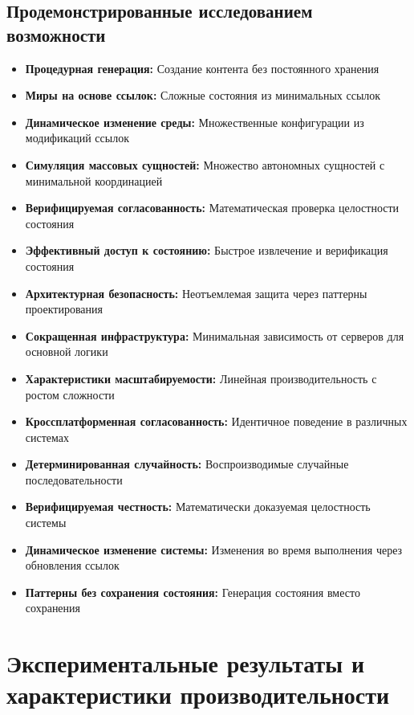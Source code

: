 \documentclass[14pt, a4paper]{extarticle}
\begin{document}
\subsection{Продемонстрированные исследованием возможности}
\begin{itemize}
    \item \textbf{Процедурная генерация:} Создание контента без постоянного хранения
    \item \textbf{Миры на основе ссылок:} Сложные состояния из минимальных ссылок
    \item \textbf{Динамическое изменение среды:} Множественные конфигурации из модификаций ссылок
    \item \textbf{Симуляция массовых сущностей:} Множество автономных сущностей с минимальной координацией
    \item \textbf{Верифицируемая согласованность:} Математическая проверка целостности состояния
    \item \textbf{Эффективный доступ к состоянию:} Быстрое извлечение и верификация состояния
    \item \textbf{Архитектурная безопасность:} Неотъемлемая защита через паттерны проектирования
    \item \textbf{Сокращенная инфраструктура:} Минимальная зависимость от серверов для основной логики
    \item \textbf{Характеристики масштабируемости:} Линейная производительность с ростом сложности
    \item \textbf{Кроссплатформенная согласованность:} Идентичное поведение в различных системах
    \item \textbf{Детерминированная случайность:} Воспроизводимые случайные последовательности
    \item \textbf{Верифицируемая честность:} Математически доказуемая целостность системы
    \item \textbf{Динамическое изменение системы:} Изменения во время выполнения через обновления ссылок
    \item \textbf{Паттерны без сохранения состояния:} Генерация состояния вместо сохранения
\end{itemize}

\section{Экспериментальные результаты и характеристики производительности}
\end{document}

